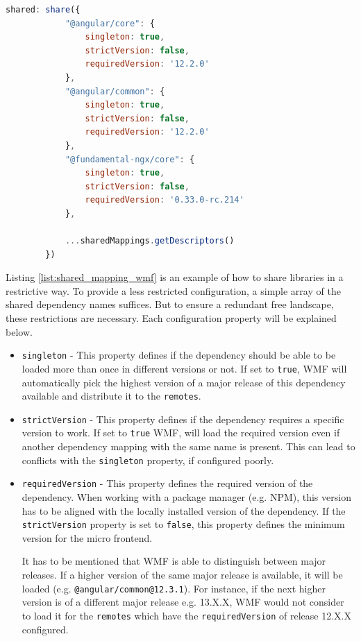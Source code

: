 \begin{lstlisting}[language=JavaScript, caption=Example of sharing dependencies configured in the \texttt{webpack.config.js}, label=list:shared_mapping_wmf,  xleftmargin=.01\textwidth, xrightmargin=.01\textwidth]
	  shared: share({
			"@angular/core": { 
				singleton: true, 
				strictVersion: false, 
				requiredVersion: '12.2.0' 
			},
			"@angular/common": { 
				singleton: true, 
				strictVersion: false, 
				requiredVersion: '12.2.0' 
			},
			"@fundamental-ngx/core": { 
				singleton: true, 
				strictVersion: false, 
				requiredVersion: '0.33.0-rc.214' 
			},
			
			...sharedMappings.getDescriptors()
		})
\end{lstlisting}

Listing \ref{list:shared_mapping_wmf} is an example of how to share libraries in a restrictive way. To provide a less restricted configuration, a simple array of the shared dependency names suffices. But to ensure a redundant free landscape, these restrictions are necessary. Each configuration property will be explained below.

\begin{itemize}
	\item \texttt{singleton} - This property defines if the dependency should be able to be loaded more than once in different versions or not. If set to \texttt{true}, WMF will automatically pick the highest version of a major release of this dependency available and distribute it to the \texttt{remotes}.\cite{wmf_version_mismatch}
	
	\item \texttt{strictVersion} - This property defines if the dependency requires a specific version to work. If set to \texttt{true} WMF, will load the required version even if another dependency mapping with the same name is present. This can lead to conflicts with the \texttt{singleton} property, if configured poorly.
	
	\item \texttt{requiredVersion} - This property defines the required version of the dependency. When working with a package manager (e.g. NPM), this version has to be aligned with the locally installed version of the dependency. If the \texttt{strictVersion} property is set to \texttt{false}, this property defines the minimum version for the micro frontend. 
	
	It has to be mentioned that WMF is able to distinguish between major releases. If a higher version of the same major release is available, it will be loaded (e.g. \texttt{@angular/common@12.3.1}). For instance, if the next higher version is of a different major release e.g. 13.X.X, WMF would not consider to load it for the \texttt{remotes} which have the \texttt{requiredVersion} of release 12.X.X configured.
\end{itemize}

